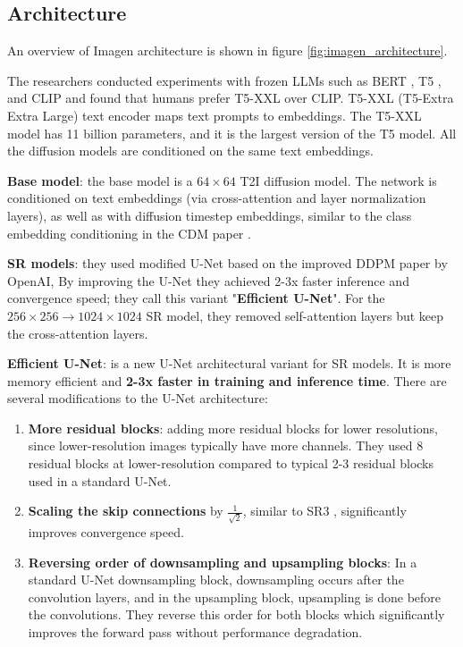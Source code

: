 \subsection{Architecture}

An overview of Imagen architecture is shown in figure \ref{fig:imagen_architecture}.

The researchers conducted experiments with frozen LLMs such as BERT \cite{bert}, T5 \cite{t5_model}, and CLIP \cite{openai_clip} and found that humans prefer T5-XXL over CLIP. T5-XXL (T5-Extra Extra Large) text encoder maps text prompts to embeddings. The T5-XXL model has 11 billion parameters, and it is the largest version of the T5 model. All the diffusion models are conditioned on the same text embeddings.

\textbf{Base model}: the base model is a $64\times 64$ T2I diffusion model. The network is conditioned on text embeddings (via cross-attention and layer normalization layers), as well as with diffusion timestep embeddings, similar to the class embedding conditioning in the CDM paper \cite{cascaded_diffusion_models}.

\textbf{SR models}: they used modified U-Net based on the improved DDPM paper \cite{openai_improved_ddpm} by OpenAI, By improving the U-Net they achieved 2-3x faster inference and convergence speed; they call this variant "\textbf{Efficient U-Net}". For the $256\times 256 \rightarrow 1024\times 1024$ SR model, they removed self-attention layers but keep the cross-attention layers.

\textbf{Efficient U-Net}: is a new U-Net architectural variant for SR models. It is more memory efficient and \textbf{2-3x faster in training and inference time}. There are several modifications to the U-Net architecture:

\begin{enumerate}
    \item \textbf{More residual blocks}: adding more residual blocks for lower resolutions, since lower-resolution images typically have more channels. They used 8 residual blocks at lower-resolution compared to typical 2-3 residual blocks used in a standard U-Net.
    \item \textbf{Scaling the skip connections} by $\frac{1}{\sqrt{2}}$, similar to SR3 \cite{sr3}, significantly improves convergence speed.
    \item \textbf{Reversing order of downsampling and upsampling blocks}: In a standard U-Net downsampling block, downsampling occurs after the convolution layers, and in the upsampling block, upsampling is done before the convolutions. They reverse this order for both blocks which significantly improves the forward pass without performance degradation.
\end{enumerate}


